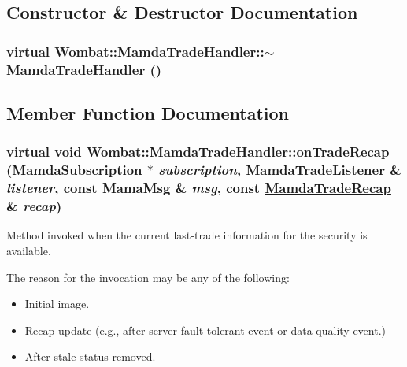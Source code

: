 \subsection{Constructor \& Destructor Documentation}
\hypertarget{classWombat_1_1MamdaTradeHandler_d4baa77255511ab84e6dc3152ea3682f}{
\subsubsection[$\sim$MamdaTradeHandler]{\setlength{\rightskip}{0pt plus 5cm}virtual Wombat::Mamda\-Trade\-Handler::$\sim$Mamda\-Trade\-Handler ()}}
\label{classWombat_1_1MamdaTradeHandler_d4baa77255511ab84e6dc3152ea3682f}




\subsection{Member Function Documentation}
\hypertarget{classWombat_1_1MamdaTradeHandler_1b60cb151264fa92967be4c6468e2fbe}{
\subsubsection[onTradeRecap]{\setlength{\rightskip}{0pt plus 5cm}virtual void Wombat::Mamda\-Trade\-Handler::on\-Trade\-Recap (\hyperlink{classWombat_1_1MamdaSubscription}{Mamda\-Subscription} $\ast$ {\em subscription}, \hyperlink{classWombat_1_1MamdaTradeListener}{Mamda\-Trade\-Listener} \& {\em listener}, const Mama\-Msg \& {\em msg}, const \hyperlink{classWombat_1_1MamdaTradeRecap}{Mamda\-Trade\-Recap} \& {\em recap})}}
\label{classWombat_1_1MamdaTradeHandler_1b60cb151264fa92967be4c6468e2fbe}


Method invoked when the current last-trade information for the security is available. 

The reason for the invocation may be any of the following:\begin{itemize}
\item Initial image.\item Recap update (e.g., after server fault tolerant event or data quality event.)\item After stale status removed.\end{itemize}



